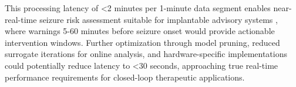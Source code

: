This processing latency of <2 minutes per 1-minute data segment enables near-real-time seizure risk assessment suitable for implantable advisory systems \cite{Kuhlmann2018SeizurePA}, where warnings 5-60 minutes before seizure onset would provide actionable intervention windows. Further optimization through model pruning, reduced surrogate iterations for online analysis, and hardware-specific implementations could potentially reduce latency to <30 seconds, approaching true real-time performance requirements for closed-loop therapeutic applications.




\label{sec:discussion}

